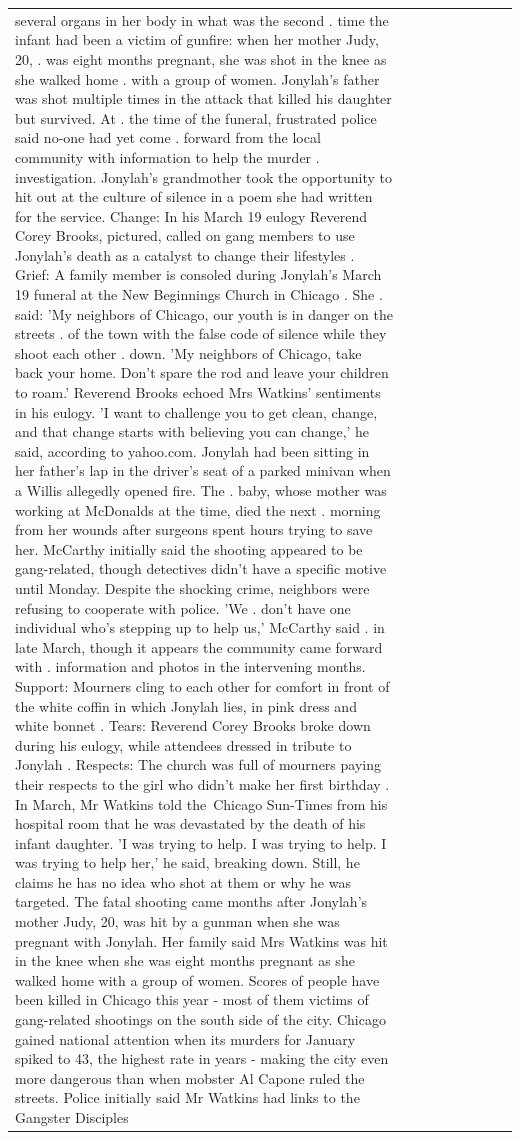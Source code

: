 \begin{table}[H]
\begin{tabular}{lllrlllll}
several organs in her body in what was the second . time the infant had been a victim of gunfire: when her mother Judy, 20, . was eight months pregnant, she was shot in the knee as she walked home . with a group of women. Jonylah's father was shot multiple times in the attack that killed his daughter but survived. At . the time of the funeral, frustrated police said no-one had yet come . forward from the local community with information to help the murder . investigation. Jonylah's grandmother took the opportunity to hit out at the culture of silence in a poem she had written for the service. Change: In his March 19 eulogy Reverend Corey Brooks, pictured, called on gang members to use Jonylah's death as a catalyst to change their lifestyles . Grief: A family member is consoled during Jonylah's March 19 funeral at the New Beginnings Church in Chicago . She . said: 'My neighbors of Chicago, our youth is in danger on the streets . of the town with the false code of silence while they shoot each other . down. 'My neighbors of Chicago, take back your home. Don't spare the rod and leave your children to roam.' Reverend Brooks echoed Mrs Watkins' sentiments in his eulogy. 'I want to challenge you to get clean, change, and that change starts with believing you can change,' he said, according to yahoo.com. Jonylah had been sitting in her father's lap in the driver's seat of a parked minivan when a Willis allegedly opened fire. The . baby, whose mother was working at McDonalds at the time, died the next . morning from her wounds after surgeons spent hours trying to save her. McCarthy initially said the shooting appeared to be gang-related, though detectives didn't have a specific motive until Monday. Despite the shocking crime, neighbors were refusing to cooperate with police. 'We . don't have one individual who's stepping up to help us,' McCarthy said . in late March, though it appears the community came forward with . information and photos in the intervening months. Support: Mourners cling to each other for comfort in front of the white coffin in which Jonylah lies, in pink dress and white bonnet . Tears: Reverend Corey Brooks broke down during his eulogy, while attendees dressed in tribute to Jonylah . Respects: The church was full of mourners paying their respects to the girl who didn't make her first birthday . In March, Mr Watkins told the Chicago Sun-Times from his hospital room that he was devastated by the death of his infant daughter. 'I was trying to help. I was trying to help. I was trying to help her,' he said, breaking down. Still, he claims he has no idea who shot at them or why he was targeted. The fatal shooting came months after Jonylah's mother Judy, 20, was hit by a gunman when she was pregnant with Jonylah. Her family said Mrs Watkins was hit in the knee when she was eight months pregnant as she walked home with a group of women. Scores of people have been killed in Chicago this year - most of them victims of gang-related shootings on the south side of the city. Chicago gained national attention when its murders for January spiked to 43, the highest rate in years - making the city even more dangerous than when mobster Al Capone ruled the streets. Police initially said Mr Watkins had links to the Gangster Disciples 
\end{tabular}
\end{table}
